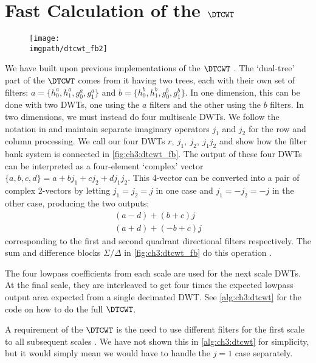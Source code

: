 \section{Fast Calculation of the $\DTCWT$}\label{sec:ch3:dtcwt}
\begin{figure}
  \texttt{[image: \\imgpath/dtcwt\_fb2]}
  \label{fig:ch3:dtcwt_fb}
\end{figure}
We have built upon previous implementations of the $\DTCWT$
\cite{kingsbury_dtcwt_2003, cai_2-d_2011, wareham_dtcwt_2014}. The `dual-tree'
part of the $\DTCWT$ comes from it having two trees, each with their own set of filters:
$a = \{h_0^a, h_1^a, g_0^a, g_1^a\}$ and $b = \{h_0^b, h_1^b, g_0^b, g_1^b\}$. In one dimension, this
can be done with two DWTs, one using the $a$ filters and the other using the $b$
filters. In two dimensions, we must instead do
four multiscale DWTs. We follow the notation in \cite{kingsbury_image_1999} and
maintain separate imaginary operators $j_1$ and $j_2$ for the row and column
processing. We call our four DWTs $r,\ j_1,\ j_2,\ j_1j_2$ and show how the
filter bank system is connected in \autoref{fig:ch3:dtcwt_fb}. The output of
these four DWTs can be interpreted as a four-element `complex' vector $\{a, b,
c, d\} = a + bj_1 + cj_2 + dj_1j_2$. This 4-vector can be converted into a pair
of complex 2-vectors by letting $j_1 = j_2 = j$ in one case and $j_1 = -j_2=-j$
in the other case, producing the two outputs:
\begin{align}
  (a-d) + (b+c)j\\
  (a+d) + (-b+c)j
\end{align}
corresponding to the first and second quadrant directional filters respectively.
The sum and difference blocks $\Sigma/\Delta$ in \autoref{fig:ch3:dtcwt_fb} do
this operation \cite{kingsbury_image_1999}. 

The four lowpass coefficients from each scale are used for the next scale DWTs. At the
final scale, they are interleaved to get four times the expected lowpass output
area expected from a single decimated DWT\@.
See \autoref{alg:ch3:dtcwt} for the code on how to do the full $\DTCWT$.

A requirement of the $\DTCWT$ is the need to use different filters for the first
scale to all subsequent scales \cite{selesnick_dual-tree_2005}. We have not
shown this in \autoref{alg:ch3:dtcwt} for simplicity, but it would simply mean
we would have to handle the $j=1$ case separately.

